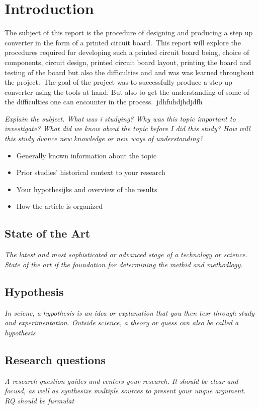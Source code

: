 
\section{Introduction}
The subject of this report is the procedure of designing and producing a step up converter in the form of a printed circuit board.\
This report will explore the procedures required for developing such a printed circuit board being, choice of components, circuit design, printed circuit board layout, printing the board and testing of the board but also the difficulties and and was was learned throughout the project.\ 
The goal of the project was to successfully produce a step up converter using the tools at hand. But also to get the understanding of some of the difficulties one can encounter in the process.\
jdhfuhdjhdjdfh

\textit{Explain the subject. What was i studying? Why was this topic important to investigate? What did we know about the topic before I did this study? How will this study dvance new knowledge or new ways of understanding?}
\begin{itemize}
    \item Generally known information about the topic
    \item Prior studies' historical context to your research
    \item Your hypothesijks and overview of the results
    \item How the article is organized
\end{itemize}
\subsection{State of the Art}
\textit{The latest and most sophisticated or advanced stage of a technology or science. State of the art if the foundation for determining the methid and methodlogy.}
\subsection{Hypothesis}
\textit{In scienc, a hypothesis is an idea or explanation that you then tesr through study and experimentation. Outside science, a theory or quess can also be called a hypothesis}
\subsection{Research questions}
\textit{A research question guides and centers your research. It should be clear and focusd, as well as synthesize multiple sources to present your unque argument. RQ should be furmulat}
